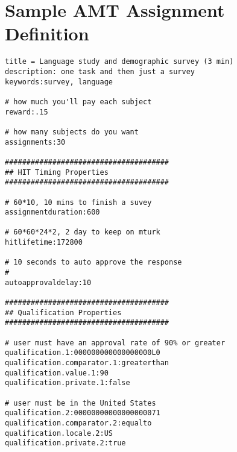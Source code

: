 
\chapter{Sample AMT Assignment Definition}
\label{assignment}
\lstset{numbers=none}
\begin{lstlisting}
title = Language study and demographic survey (3 min)
description: one task and then just a survey
keywords:survey, language

# how much you'll pay each subject
reward:.15

# how many subjects do you want
assignments:30

######################################
## HIT Timing Properties
######################################

# 60*10, 10 mins to finish a suvey
assignmentduration:600

# 60*60*24*2, 2 day to keep on mturk
hitlifetime:172800

# 10 seconds to auto approve the response
# 
autoapprovaldelay:10

######################################
## Qualification Properties
######################################

# user must have an approval rate of 90% or greater
qualification.1:000000000000000000L0
qualification.comparator.1:greaterthan
qualification.value.1:90
qualification.private.1:false

# user must be in the United States
qualification.2:00000000000000000071
qualification.comparator.2:equalto
qualification.locale.2:US
qualification.private.2:true
\end{lstlisting}

